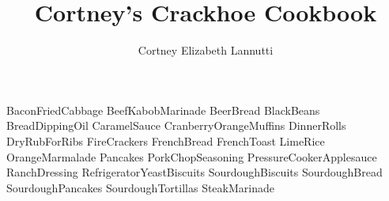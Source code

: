 \documentclass[a4paper, titlepage]{book}
\title{Cortney's Crackhoe Cookbook}
\author{Cortney Elizabeth Lannutti}
\date{}
\begin{document}
\maketitle
{}
\tableofcontents
\newpage
{}

{BaconFriedCabbage}
{BeefKabobMarinade}
{BeerBread}
{BlackBeans}
{BreadDippingOil}
{CaramelSauce}
{CranberryOrangeMuffins}
{DinnerRolls}
{DryRubForRibs}
{FireCrackers}
{FrenchBread}
{FrenchToast}
{LimeRice}
{OrangeMarmalade}
{Pancakes}
{PorkChopSeasoning}
{PressureCookerApplesauce}
{RanchDressing}
{RefrigeratorYeastBiscuits}
{SourdoughBiscuits}
{SourdoughBread}
{SourdoughPancakes}
{SourdoughTortillas}
{SteakMarinade}
\end{document}
